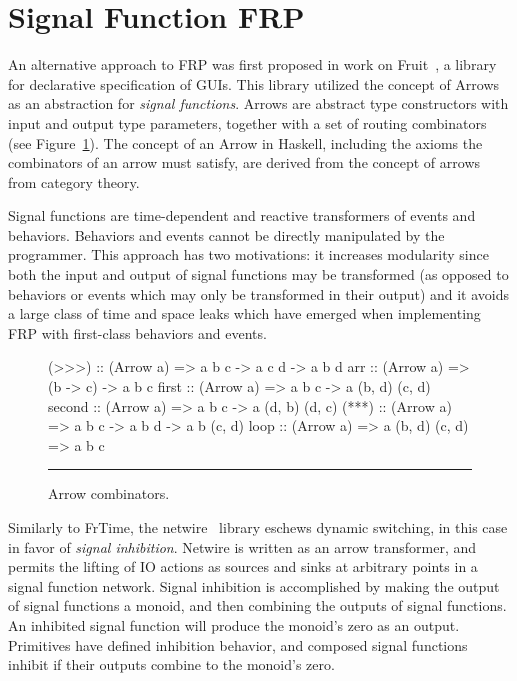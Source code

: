 \section{Signal Function FRP}
\label{section:Background-signal_function_frp}

An alternative approach to FRP was first proposed in work on
Fruit~\cite{Courtney2001-1}, a library for declarative specification of GUIs.
This library utilized the concept of Arrows~\cite{Hughes2000} as an abstraction
for {\em signal functions}. Arrows are abstract type constructors with input and
output type parameters, together with a set of routing combinators (see
Figure~\ref{figure:arrow_combinators}). The concept of an Arrow in Haskell,
including the axioms the combinators of an arrow must satisfy, are derived from
the concept of arrows from category theory.

Signal functions are time-dependent and reactive transformers of events and
behaviors. Behaviors and events cannot be directly manipulated by the programmer.
This approach has two motivations: it increases modularity since both the input
and output of signal functions may be transformed (as opposed to behaviors or
events which may only be transformed in their output) and it avoids a large
class of time and space leaks which have emerged when implementing FRP with
first-class behaviors and events.

\begin{figure}
\begin{code}
(>>>)  :: (Arrow a) => a b c -> a c d -> a b d
arr    :: (Arrow a) => (b -> c) -> a b c
first  :: (Arrow a) => a b c -> a (b, d) (c, d)
second :: (Arrow a) => a b c -> a (d, b) (d, c)
(***)  :: (Arrow a) => a b c -> a b d -> a b (c, d)
loop   :: (Arrow a) => a (b, d) (c, d) => a b c
\end{code}
\hrule
\caption{Arrow combinators.}
\label{figure:arrow_combinators}
\end{figure}

Similarly to FrTime, the netwire~\cite{Soylemez} library eschews dynamic
switching, in this case in favor of {\em signal inhibition}. Netwire is written
as an arrow transformer, and permits the lifting of IO actions as sources and
sinks at arbitrary points in a signal function network. Signal inhibition is
accomplished by making the output of signal functions a monoid, and then
combining the outputs of signal functions. An inhibited signal function will
produce the monoid's zero as an output. Primitives have defined inhibition
behavior, and composed signal functions inhibit if their outputs combine to the
monoid's zero.


